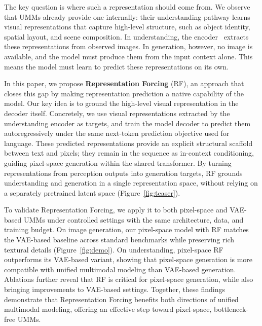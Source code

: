\documentclass{llmxive}
\begin{document}
The key question is where such a representation should come from. We observe that UMMs already provide one internally: their understanding pathway learns visual representations that capture high-level structure, such as object identity, spatial layout, and scene composition. In understanding, the encoder~\cite{siglip,tschannen2025siglip2,dinov2,dinov3} extracts these representations from observed images. In generation, however, no image is available, and the model must produce them from the input context alone. This means the model must learn to predict these representations on its own.


In this paper, we propose \textbf{Representation Forcing} (RF), an approach that closes this gap by making representation prediction a native capability of the model. Our key idea is to ground the high-level visual representation in the decoder itself. Concretely, we use visual representations extracted by the understanding encoder as targets, and train the model decoder to predict them autoregressively under the same next-token prediction objective used for language. These predicted representations provide an explicit structural scaffold between text and pixels; they remain in the sequence as in-context conditioning, guiding pixel-space generation within the shared transformer. By turning representations from perception outputs into generation targets, RF grounds understanding and generation in a single representation space, without relying on a separately pretrained latent space (Figure~\ref{fig:teaser}).



To validate Representation Forcing, we apply it to both pixel-space and VAE-based UMMs under controlled settings with the same architecture, data, and training budget. On image generation, our pixel-space model with RF matches the VAE-based baseline across standard benchmarks while preserving rich textural details (Figure~\ref{fig:demo}). On understanding, pixel-space RF outperforms its VAE-based variant, showing that pixel-space generation is more compatible with unified multimodal modeling than VAE-based generation. Ablations further reveal that RF is critical for pixel-space generation, while also bringing improvements to VAE-based settings. Together, these findings demonstrate that Representation Forcing benefits both directions of unified multimodal modeling, offering an effective step toward pixel-space, bottleneck-free UMMs.
\end{document}
